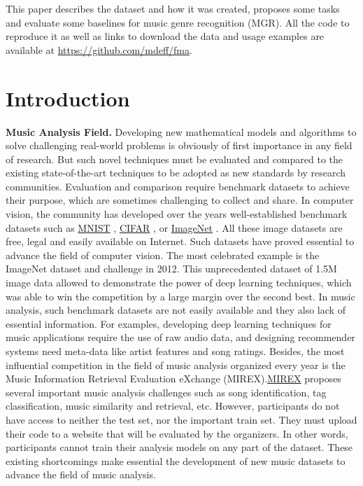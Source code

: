 \documentclass{article}
\begin{document}
This paper describes the dataset and how it was created, proposes some tasks and evaluate some baselines for music genre recognition (MGR).
All the code to reproduce it as well as links to download the data and usage examples are available at \url{https://github.com/mdeff/fma}.


\section{Introduction} %


\noindent
{\bf Music Analysis Field.} Developing new mathematical models and algorithms to solve challenging real-world problems is obviously of first importance in any field of research. But such novel techniques must be evaluated and compared to the existing state-of-the-art techniques to be adopted as new standards by research communities. Evaluation and comparison require benchmark datasets to achieve their purpose, which are sometimes challenging to collect and share. In computer vision, the community has developed over the years well-established benchmark datasets such as \href{http://yann.lecun.com/exdb/mnist/}{MNIST} \cite{mnist}, \href{https://www.cs.toronto.edu/~kriz/cifar.html}{CIFAR} \cite{cifar}, or \href{http://www.image-net.org}{ImageNet} \cite{imagenet}. All these image datasets are free, legal and easily available on Internet. Such datasets have proved essential to advance the field of computer vision. The most celebrated example is the ImageNet dataset and challenge in 2012. This unprecedented dataset of 1.5M image data allowed to demonstrate the power of deep learning techniques, which was able to win the competition by a large margin over the second best. In music analysis, such benchmark datasets are not easily available and they also lack of essential information. For examples, developing deep learning techniques for music applications require the use of raw audio data, and designing recommender systems need meta-data like artist features and song ratings. Besides, the most influential competition in the field of music analysis organized every year is the Music Information Retrieval Evaluation eXchange (MIREX).\href{http://www.music-ir.org/mirex/wiki/}{MIREX} proposes several important music analysis challenges such as song identification, tag classification, music similarity and retrieval, etc. However, participants do not have access to neither the test set, nor the important train set. They must upload their code to a website that will be evaluated by the organizers. In other words, participants cannot train their analysis models on any part of the dataset. These existing shortcomings make essential the development of new music datasets to advance the field of music analysis.   \\
\end{document}
